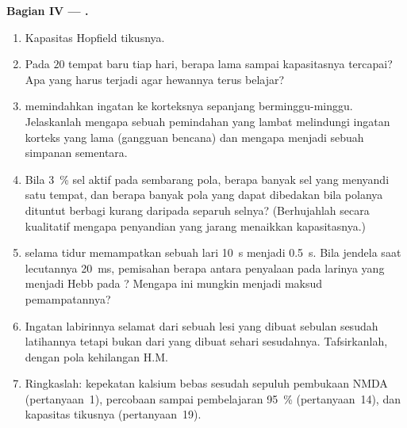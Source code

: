 \begin{problem}
\medskip
\noindent\textbf{Bagian IV --- .}
\begin{enumerate}[resume]
  \item Kapasitas Hopfield  tikusnya.
  \item Pada $20$ tempat baru tiap hari, berapa lama sampai kapasitasnya
        tercapai? Apa yang harus terjadi agar hewannya terus belajar?
  \item {} memindahkan ingatan ke korteksnya sepanjang berminggu-minggu.
        Jelaskanlah mengapa sebuah pemindahan yang lambat melindungi ingatan korteks yang lama
        (gangguan bencana) dan mengapa  menjadi sebuah simpanan
        sementara.
  \item Bila \qty{3}{\%} sel  aktif pada sembarang pola, berapa banyak
        sel yang menyandi satu tempat, dan berapa banyak pola yang dapat
        dibedakan bila polanya dituntut berbagi kurang daripada
        separuh selnya? (Berhujahlah secara kualitatif mengapa penyandian yang jarang menaikkan
        kapasitasnya.)
  \item {} selama tidur memampatkan sebuah lari \qty{10}{s} menjadi
        \qty{0.5}{s}. Bila jendela saat lecutannya \qty{20}{ms}, pemisahan
        berapa antara penyalaan  pada larinya yang menjadi
        Hebb pada ? Mengapa ini mungkin menjadi maksud
        pemampatannya?
  \item Ingatan labirinnya selamat dari sebuah lesi  yang dibuat sebulan
        sesudah latihannya tetapi bukan dari yang dibuat sehari sesudahnya. Tafsirkanlah, dengan
        pola kehilangan H.M.
  \item Ringkaslah: kepekatan kalsium bebas sesudah sepuluh pembukaan
        NMDA (pertanyaan~1), percobaan sampai pembelajaran \qty{95}{\%}
        (pertanyaan~14), dan kapasitas  tikusnya (pertanyaan~19).
\end{enumerate}
\end{problem}
